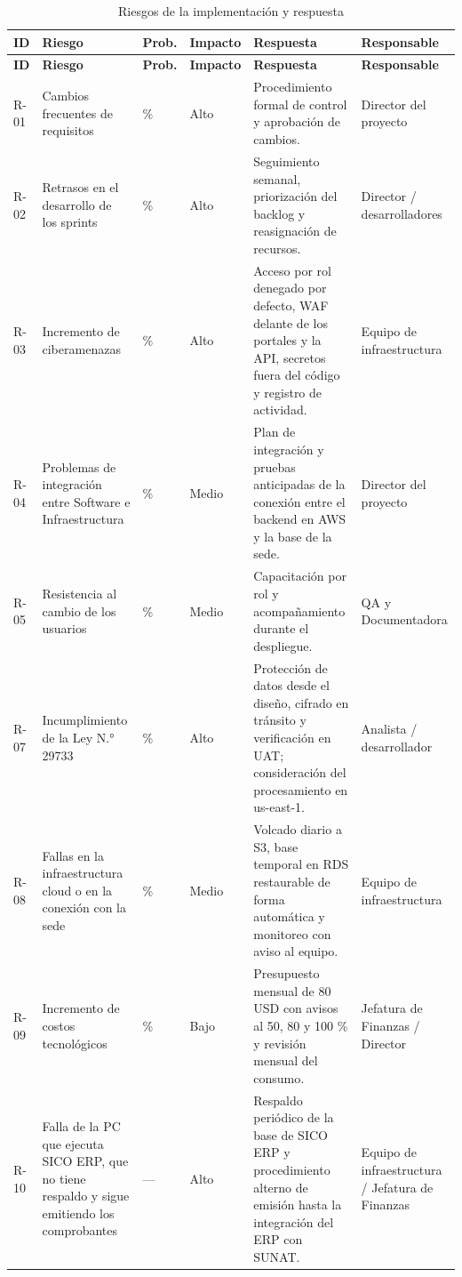 {\small
\renewcommand{\arraystretch}{1.3}
\begin{longtable}{|>{\raggedright\arraybackslash}p{0.46cm}|>{\raggedright\arraybackslash}p{4.62cm}|>{\raggedright\arraybackslash}p{0.46cm}|>{\raggedright\arraybackslash}p{0.54cm}|>{\raggedright\arraybackslash}p{4.62cm}|>{\raggedright\arraybackslash}p{3.70cm}|}
\caption{Riesgos de la implementación y respuesta}\label{tab:cap4-5}\\
\hline
\textbf{ID} & \textbf{Riesgo} & \textbf{Prob.} & \textbf{Impacto} & \textbf{Respuesta} & \textbf{Responsable} \\
\hline
\endfirsthead
\hline
\textbf{ID} & \textbf{Riesgo} & \textbf{Prob.} & \textbf{Impacto} & \textbf{Respuesta} & \textbf{Responsable} \\
\hline
\endhead
R-01 & Cambios frecuentes de requisitos & 70 \% & Alto & Procedimiento formal de control y aprobación de cambios. & Director del proyecto \\
\hline
R-02 & Retrasos en el desarrollo de los sprints & 50 \% & Alto & Seguimiento semanal, priorización del backlog y reasignación de recursos. & Director / desarrolladores \\
\hline
R-03 & Incremento de ciberamenazas & 50 \% & Alto & Acceso por rol denegado por defecto, WAF delante de los portales y la API, secretos fuera del código y registro de actividad. & Equipo de infraestructura \\
\hline
R-04 & Problemas de integración entre Software e Infraestructura & 45 \% & Medio & Plan de integración y pruebas anticipadas de la conexión entre el backend en AWS y la base de la sede. & Director del proyecto \\
\hline
R-05 & Resistencia al cambio de los usuarios & 45 \% & Medio & Capacitación por rol y acompañamiento durante el despliegue. & QA y Documentadora \\
\hline
R-07 & Incumplimiento de la Ley N.° 29733 & 30 \% & Alto & Protección de datos desde el diseño, cifrado en tránsito y verificación en UAT; consideración del procesamiento en us-east-1. & Analista / desarrollador \\
\hline
R-08 & Fallas en la infraestructura cloud o en la conexión con la sede & 25 \% & Medio & Volcado diario a S3, base temporal en RDS restaurable de forma automática y monitoreo con aviso al equipo. & Equipo de infraestructura \\
\hline
R-09 & Incremento de costos tecnológicos & 25 \% & Bajo & Presupuesto mensual de 80 USD con avisos al 50, 80 y 100 \% y revisión mensual del consumo. & Jefatura de Finanzas / Director \\
\hline
R-10 & Falla de la PC que ejecuta SICO ERP, que no tiene respaldo y sigue emitiendo los comprobantes & — & Alto & Respaldo periódico de la base de SICO ERP y procedimiento alterno de emisión hasta la integración del ERP con SUNAT. & Equipo de infraestructura / Jefatura de Finanzas \\
\hline
\end{longtable}
}


